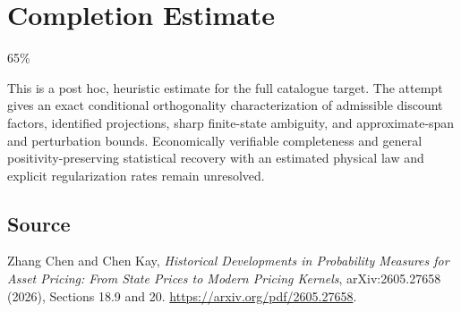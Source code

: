 \documentclass[11pt]{article}
\begin{document}
\section{Completion Estimate}
65\%

This is a post hoc, heuristic estimate for the full catalogue target.
The attempt gives an exact conditional orthogonality characterization of admissible discount factors, identified projections, sharp finite-state ambiguity, and approximate-span and perturbation bounds. Economically verifiable completeness and general positivity-preserving statistical recovery with an estimated physical law and explicit regularization rates remain unresolved.

\subsection*{Source}
Zhang Chen and Chen Kay, \emph{Historical Developments in Probability
Measures for Asset Pricing: From State Prices to Modern Pricing Kernels},
arXiv:2605.27658 (2026), Sections 18.9 and 20.
\url{https://arxiv.org/pdf/2605.27658}.
\end{document}

